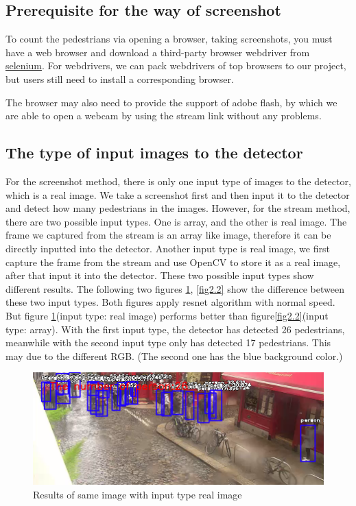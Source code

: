 \documentclass[runningheads]{llncs}
\begin{document}
\subsection{Prerequisite for the way of screenshot}
To count the pedestrians via opening a browser, taking screenshots, you must have a web browser and download a third-party browser webdriver from \href{https://www.seleniumhq.org/download/}{selenium}. For webdrivers, we can pack webdrivers of top browsers to our project, but users still need to install a corresponding browser.

The browser may also need to provide the support of adobe flash, by which we are able to open a webcam by using the stream link without any problems.

\subsection{The type of input images to the detector}
For the screenshot method, there is only one input type of images to the detector, which is a real image. We take a screenshot first and then input it to the detector and detect how many pedestrians in the images. However, for the stream method, there are two possible input types. One is array, and the other is real image. The frame we captured from the stream is an array like image, therefore it can be directly inputted into the detector. Another input type is real image, we first capture the frame from the stream and use OpenCV to store it as a real image, after that input it into the detector. These two possible input types show different results. The following two figures \ref{fig2.1}, \ref{fig2.2} show the difference between these two input types. Both figures apply resnet algorithm with normal speed. But figure \ref{fig2.1}(input type: real image) performs better than figure\ref{fig2.2}(input type: array). With the first input type, the detector has detected 26 pedestrians, meanwhile with the second input type only has detected 17 pedestrians. This may due to the different RGB. (The second one has the blue background color.) 
\begin{figure}
\includegraphics[width=\textwidth]{figs/problem_imgtype1.png}
\caption{Results of same image with input type real image} \label{fig2.1}
\end{figure}
\end{document}
